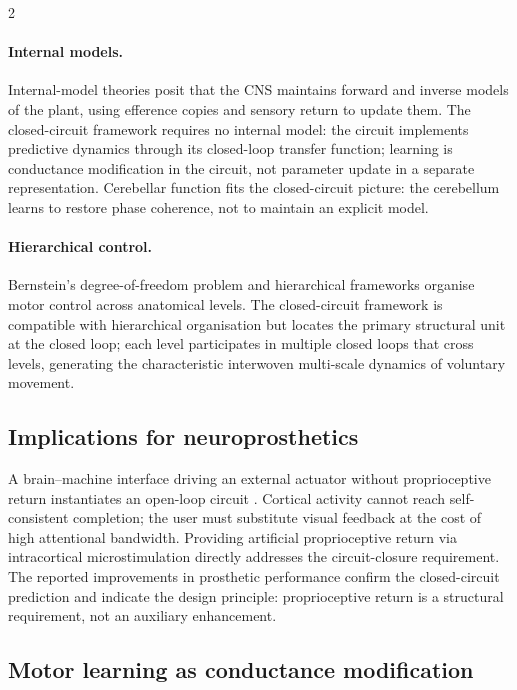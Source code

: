 \begin{multicols}{2}
\paragraph{Internal models.}
Internal-model theories \citep{kawato1999,wolpert2000,shadmehr2008} posit
that the CNS maintains forward and inverse models of the plant, using efference
copies and sensory return to update them.  The closed-circuit framework
requires no internal model: the circuit implements predictive dynamics through
its closed-loop transfer function; learning is conductance modification in the
circuit, not parameter update in a separate representation.  Cerebellar
function fits the closed-circuit picture: the cerebellum learns to restore
phase coherence, not to maintain an explicit model.

\paragraph{Hierarchical control.}
Bernstein's degree-of-freedom problem \citep{bernstein1967} and hierarchical
frameworks \citep{latash2010} organise motor control across anatomical levels.
The closed-circuit framework is compatible with hierarchical organisation but
locates the primary structural unit at the closed loop; each level participates
in multiple closed loops that cross levels, generating the characteristic
interwoven multi-scale dynamics of voluntary movement.

\subsection{Implications for neuroprosthetics}

A brain--machine interface driving an external actuator without proprioceptive
return instantiates an open-loop circuit \citep{hochberg2006,ajiboye2017}.
Cortical activity cannot reach self-consistent completion; the user must
substitute visual feedback at the cost of high attentional bandwidth.
Providing artificial proprioceptive return via intracortical microstimulation
\citep{flesher2016,flesher2021} directly addresses the circuit-closure
requirement.  The reported improvements in prosthetic performance confirm the
closed-circuit prediction and indicate the design principle: proprioceptive
return is a structural requirement, not an auxiliary enhancement.

\subsection{Motor learning as conductance modification}


\end{multicols}
